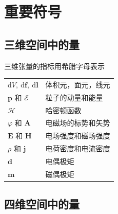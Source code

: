 
\chapter*{重要符号}
{}

\section*{三维空间中的量}

\noindent 三维张量的指标用希腊字母表示\par
\medskip
\noindent
\begin{tabular}{@{}p{5.2cm}@{\qquad}p{9.6cm}@{}}
$\mathrm{d}V,\ \mathrm{d}\boldsymbol{f},\ \mathrm{d}\boldsymbol{l}$ & 体积元，面元，线元 \\
$\boldsymbol{p}$ 和 $\mathcal{E}$ & 粒子的动量和能量 \\
$\mathcal{H}$ & 哈密顿函数 \\
$\varphi$ 和 $\boldsymbol{A}$ & 电磁场的标势和矢势 \\
$\boldsymbol{E}$ 和 $\boldsymbol{H}$ & 电场强度和磁场强度 \\
$\rho$ 和 $\boldsymbol{j}$ & 电荷密度和电流密度 \\
$\boldsymbol{d}$ & 电偶极矩 \\
$\boldsymbol{m}$ & 磁偶极矩 \\
\end{tabular}

\section*{四维空间中的量}

